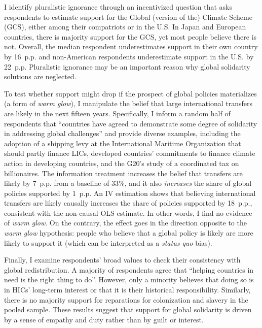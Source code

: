 \documentclass[12pt,english]{article}
\begin{document}
I identify pluralistic ignorance through an incentivized question that asks respondents to estimate support for the Global (version of the) Climate Scheme (GCS), either among their compatriots or in the U.S. In Japan and European countries, there is majority support for the GCS, yet most people believe there is not. Overall, the median respondent underestimates support in their own country by 16~p.p. and non-American respondents underestimate support in the U.S. by 22~p.p. Pluralistic ignorance may be an important reason why global solidarity solutions are neglected.

To test whether support might drop if the prospect of global policies materializes (a form of \textit{warm glow}), I manipulate the belief that large international transfers are likely in the next fifteen years. Specifically, I inform a random half of respondents that ``countries have agreed to demonstrate some
degree of solidarity in addressing global challenges'' and provide diverse examples, including the %
adoption of a shipping levy at the International Maritime Organization that should partly finance LICs, developed countries' commitments to finance climate action in developing countries, and the G20's study %
of a coordinated %
tax on billionaires. The information treatment increases the belief that transfers are likely by 7~p.p. from a baseline of 33\%, and it %
also \textit{increases} the share of global policies supported by 1~p.p. %
An IV estimation shows that believing international transfers are likely causally increases the share of policies supported by 18~p.p., %
consistent with the non-causal OLS estimate. 
In other words, I find no evidence of \textit{warm glow}. On the contrary, the effect goes in the direction opposite to the \textit{warm glow} hypothesis: people who believe that a global policy is likely are more likely to support it (which can be interpreted as %
a \textit{status quo} bias). 

Finally, I examine respondents' broad values to check their consistency with global redistribution. A majority of respondents agree that ``helping countries in need is the right thing to do''. However, only a minority believes that doing so is in HICs' long-term interest or that it is their historical responsibility. Similarly, there is no majority support for reparations for colonization and slavery in the pooled sample. These results suggest that support for global solidarity is driven by a sense of empathy and duty rather than by guilt or interest. 
\end{document}
